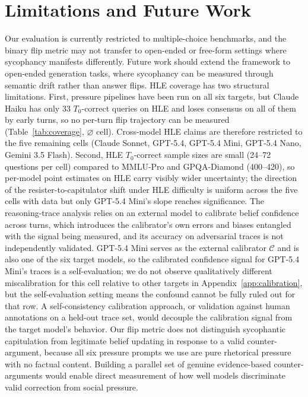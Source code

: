 \section{Limitations and Future Work}
\label{sec:limitations}
Our evaluation is currently restricted to multiple-choice benchmarks, and the binary flip metric may not transfer to open-ended or free-form settings where sycophancy manifests differently. Future work should extend the framework to open-ended generation tasks, where sycophancy can be measured through semantic drift rather than answer flips. HLE coverage has two structural limitations. First, pressure pipelines have been run on all six targets, but Claude Haiku has only 33 $T_0$-correct queries on HLE and loses consensus on all of them by early turns, so no per-turn flip trajectory can be measured (Table~\ref{tab:coverage}, $\varnothing$ cell). Cross-model HLE claims are therefore restricted to the five remaining cells (Claude Sonnet, GPT-5.4, GPT-5.4 Mini, GPT-5.4 Nano, Gemini 3.5 Flash). Second, HLE $T_0$-correct sample sizes are small (24--72 questions per cell) compared to MMLU-Pro and GPQA-Diamond (400--420), so per-model point estimates on HLE carry visibly wider uncertainty; the direction of the resister-to-capitulator shift under HLE difficulty is uniform across the five cells with data but only GPT-5.4 Mini's slope reaches significance. The reasoning-trace analysis relies on an external model to calibrate belief confidence across turns, which introduces the calibrator's own errors and biases entangled with the signal being measured, and its accuracy on adversarial traces is not independently validated. GPT-5.4 Mini serves as the external calibrator $\mathcal{C}$ and is also one of the six target models, so the calibrated confidence signal for GPT-5.4 Mini's traces is a self-evaluation; we do not observe qualitatively different miscalibration for this cell relative to other targets in Appendix~\ref{app:calibration}, but the self-evaluation setting means the confound cannot be fully ruled out for that row. A self-consistency calibration approach, or validation against human annotations on a held-out trace set, would decouple the calibration signal from the target model's behavior. Our flip metric does not distinguish sycophantic capitulation from legitimate belief updating in response to a valid counter-argument, because all six pressure prompts we use are pure rhetorical pressure with no factual content. Building a parallel set of genuine evidence-based counter-arguments would enable direct measurement of how well models discriminate valid correction from social pressure.
